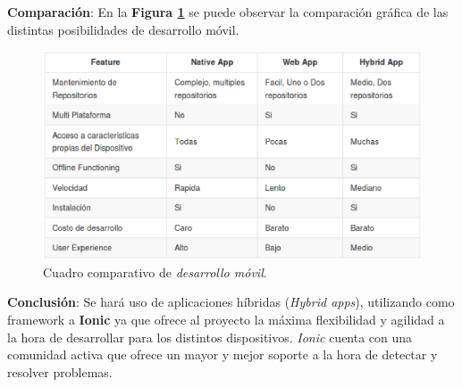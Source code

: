 \textbf{Comparación}:
En la \textbf{Figura \ref{appMobile}} se puede observar la comparación gráfica de las distintas posibilidades de desarrollo móvil.

\begin{figure}
  \centering
  \includegraphics[width=1\textwidth]{img/tp2_definicion/appMobile}
  \caption{Cuadro comparativo de \textit{desarrollo móvil}.}
  \label{appMobile}
\end{figure}

\textbf{Conclusión}:
Se hará uso de aplicaciones híbridas (\textit{Hybrid apps}), utilizando como framework a \textbf{Ionic} ya que ofrece al proyecto la máxima flexibilidad y agilidad a la hora de desarrollar para los distintos dispositivos.
\textit{Ionic} cuenta con una comunidad activa que ofrece un mayor y mejor soporte a la hora de detectar y resolver problemas.












